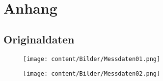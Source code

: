 \section{Anhang}
\label{sec:Anhang}
\subsection{Originaldaten}
\begin{figure}[H]
  \centering
  \texttt{[image: content/Bilder/Messdaten01.png]}
  \label{fig:Messungen_1}
\end{figure}
\begin{figure}[H]
  \centering
  \texttt{[image: content/Bilder/Messdaten02.png]}
  \label{fig:Messungen_2}
\end{figure}

